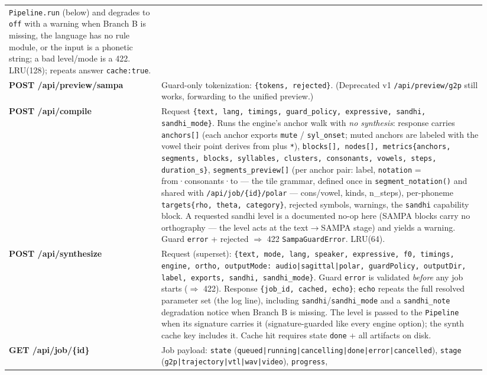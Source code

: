 \documentclass[11pt,a4paper]{article}
\begin{document}
\begin{longtable}{p{0.30\linewidth}p{0.64\linewidth}}
\texttt{Pipeline.run} (below) and degrades to \texttt{off} with a
warning when Branch B is missing, the language has no rule module, or
the input is a phonetic string; a bad level/mode is a 422. LRU(128);
repeats answer \texttt{cache:true}. \\
\textbf{POST /api/preview/sampa} & Guard-only tokenization:
\texttt{\{tokens, rejected\}}. (Deprecated v1 \texttt{/api/preview/g2p}
still works, forwarding to the unified preview.) \\
\textbf{POST /api/compile} & Request
\texttt{\{text, lang, timings, guard\_policy, expressive, sandhi,
sandhi\_mode\}}. Runs the
engine's anchor walk with \emph{no synthesis}: response carries
\texttt{anchors[]} (each anchor exports \texttt{mute} / \texttt{syl\_onset};
muted anchors are labeled with the vowel their point derives from plus
\texttt{*}), \texttt{blocks[], nodes[], metrics\{anchors, segments, blocks,
syllables, clusters, consonants, vowels, steps, duration\_s\}},
\texttt{segments\_preview[]} (per anchor pair: label,
\texttt{notation} = from·consonants·to --- the tile grammar, defined once in
\texttt{segment\_notation()} and shared with \texttt{/api/job/\{id\}/polar} ---
cons/vowel, kinds, n\_steps),
per-phoneme \texttt{targets\{rho, theta, category\}}, rejected symbols,
warnings, the \texttt{sandhi} capability block. A requested sandhi level
is a documented no-op here (SAMPA blocks carry no orthography — the
level acts at the text$\rightarrow$SAMPA stage) and yields a warning.
Guard \texttt{error} + rejected $\Rightarrow$ 422
\texttt{SampaGuardError}. LRU(64). \\
\textbf{POST /api/synthesize} & Request (superset):
\texttt{\{text, mode, lang, speaker, expressive, f0, timings, engine,
ortho, outputMode: audio|sagittal|polar, guardPolicy, outputDir, label,
exports, sandhi, sandhi\_mode\}}. Guard \texttt{error} is validated
\emph{before} any job starts ($\Rightarrow$ 422). Response
\texttt{\{job\_id, cached, echo\}};
\texttt{echo} repeats the full resolved parameter set (the log line),
including \texttt{sandhi}/\texttt{sandhi\_mode} and a
\texttt{sandhi\_note} degradation notice when Branch B is missing. The
level is passed to the \texttt{Pipeline} when its signature carries it
(signature-guarded like every engine option); the synth cache key
includes it. Cache hit requires state \texttt{done} + all artifacts on
disk. \\
\textbf{GET /api/job/\{id\}} & Job payload: \texttt{state}
(\texttt{queued|running|cancelling|done|error|cancelled}), \texttt{stage}
(\texttt{g2p|trajectory|vtl|wav|video}), \texttt{progress},

\end{longtable}
\end{document}

